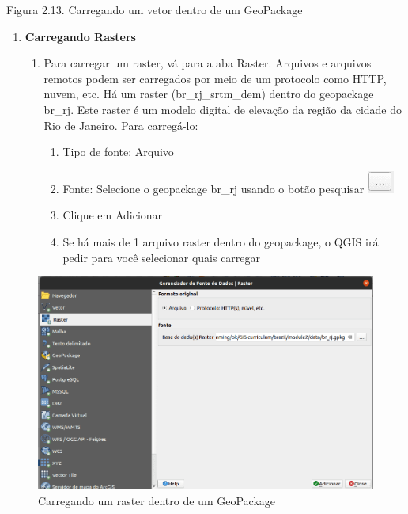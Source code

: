\documentclass[
]{krantz}
\providecommand{\tightlist}{%
  \setlength{\itemsep}{0pt}\setlength{\parskip}{0pt}}
\begin{document}
Figura 2.13. Carregando um vetor dentro de um GeoPackage

\begin{enumerate}
\def\labelenumi{\arabic{enumi}.}
\setcounter{enumi}{2}
\item
  \textbf{Carregando Rasters}

  \begin{enumerate}
  \def\labelenumii{\arabic{enumii}.}
  \item
    Para carregar um raster, vá para a aba Raster. Arquivos e arquivos remotos podem ser carregados por meio de um protocolo como HTTP, nuvem, etc. Há um raster (br\_rj\_srtm\_dem) dentro do geopackage br\_rj. Este raster é um modelo digital de elevação da região da cidade do Rio de Janeiro. Para carregá-lo:

    \begin{enumerate}
    \def\labelenumiii{\arabic{enumiii}.}
    \tightlist
    \item
      Tipo de fonte: Arquivo
    \item
      Fonte: Selecione o geopackage br\_rj usando o botão pesquisar \includegraphics{media/modulo2/data-source-manager-search.png}
    \item
      Clique em Adicionar
    \item
      Se há mais de 1 arquivo raster dentro do geopackage, o QGIS irá pedir para você selecionar quais carregar
    \end{enumerate}
  \end{enumerate}
\end{enumerate}

\begin{figure}
\centering
\includegraphics{media/modulo2/data-source-manager-raster.png}
\caption{Carregando um raster dentro de um GeoPackage}
\end{figure}
\end{document}

